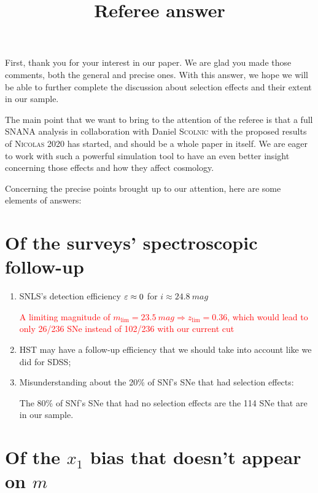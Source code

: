 \documentclass[11pt,a4paper]{paper}
\begin{document}
\title{Referee answer}
First, thank you for your interest in our paper. We are glad you made those
comments, both the general and precise ones. With this answer, we hope we will
be able to further complete the discussion about selection effects and their
extent in our sample. \bigbreak

The main point that we want to bring to the attention of the referee is that a
full SNANA analysis in collaboration with Daniel \textsc{Scolnic} with the
proposed results of \textsc{Nicolas} 2020 has started, and should be a whole
paper in itself. We are eager to work with such a powerful simulation tool to
have an even better insight concerning those effects and how they affect
cosmology. \bigbreak

Concerning the precise points brought up to our attention, here are some
elements of answers:

\section{Of the surveys' spectroscopic follow-up}
\begin{enumerate}

    \item SNLS's detection efficiency $\varepsilon \approx 0$ for $i \approx
        \SI{24.8}{mag}$\smallbreak

        \textcolor{red}{A limiting magnitude of $m_{\lim} = \SI{23.5}{mag}
        \Rightarrow z_{\lim} = 0.36$, which would lead to only 26/236 SNe
    instead of 102/236 with our current cut}
    
    \item HST may have a follow-up efficiency that we should take into account
        like we did for SDSS;

    \item Misunderstanding about the 20\% of SNf's SNe that had selection
        effects:\smallbreak

        \textcolor{dgreen}{The 80\% of SNf's SNe that had no selection
effects are the 114 SNe that are in our sample}.
\end{enumerate}

\section{Of the $x_1$ bias that doesn't appear on $m$}
\end{document}
